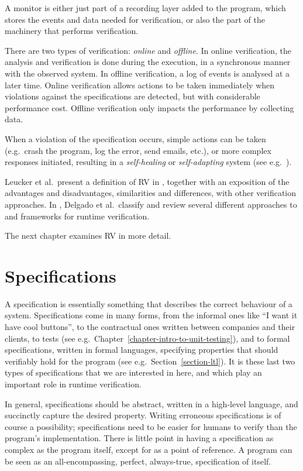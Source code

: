 \documentclass[a4paper,11pt]{kth-mag}
\begin{document}
A monitor is either just part of a recording layer added to the program, which
stores the events and data needed for verification, or also the part of the
machinery that performs verification.

There are two types of verification: \emph{online} and \emph{offline}. In
online verification, the analysis and verification is done during the
execution, in a synchronous manner with the observed system. In offline
verification, a log of events is analysed at a later time. Online verification
allows actions to be taken immediately when violations against the
specifications are detected, but with considerable performance cost. Offline
verification only impacts the performance by collecting data.

When a violation of the specification occurs, simple actions can be taken
(e.g.\ crash the program, log the error, send emails, etc.), or more complex
responses initiated, resulting in a \textit{self-healing} or
\textit{self-adapting} system (see e.g.\ \cite{huebscher08survey}).

Leucker et al.\ present a definition of RV in \cite{leucker09abriefaccount},
together with an exposition of the advantages and disadvantages, similarities
and differences, with other verification approaches. In
\cite{delgado04taxonomy}, Delgado et al.\ classify and review several different
approaches to and frameworks for runtime verification.

The next chapter examines RV in more detail.


\section{Specifications} \label{section-specifications}

A specification is essentially something that describes the correct behaviour
of a system. Specifications come in many forms, from the informal ones like ``I
want it have cool buttons'', to the contractual ones written between companies
and their clients, to tests (see e.g.\
Chapter~\ref{chapter-intro-to-unit-testing}), and to formal specifications,
written in formal languages, specifying properties that should verifiably hold
for the program (see e.g.\ Section~\ref{section-ltl}). It is these last two
types of specifications that we are interested in here, and which play an
important role in runtime verification.

In general, specifications should be abstract, written in a high-level
language, and succinctly capture the desired property. Writing erroneous
specifications is of course a possibility; specifications need to be easier for
humans to verify than the program's implementation. There is little point in
having a specification as complex as the program itself, except for as a point
of reference. A program can be seen as an all-encompassing, perfect,
always-true, specification of itself.
\end{document}
